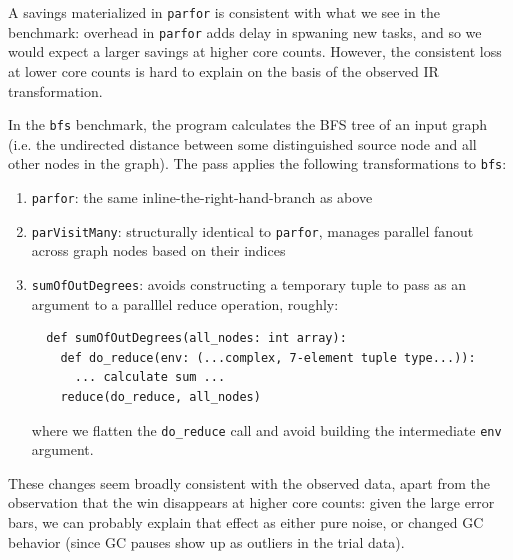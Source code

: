 
A savings materialized in \texttt{parfor} is consistent with what we see in the
benchmark: overhead in \texttt{parfor} adds delay in spwaning new tasks, and so
we would expect a larger savings at higher core counts. However, the consistent
loss at lower core counts is hard to explain on the basis of the observed IR
transformation.

In the \texttt{bfs} benchmark, the program calculates the BFS tree of an input
graph (i.e. the undirected distance between some distinguished source node and
all other nodes in the graph). The pass applies the following transformations to
\texttt{bfs}:
\begin{enumerate}
\item \texttt{parfor}: the same inline-the-right-hand-branch as above

\item \texttt{parVisitMany}: structurally identical to \texttt{parfor}, manages
  parallel fanout across graph nodes based on their indices

\item \texttt{sumOfOutDegrees}: avoids constructing a temporary tuple to pass as
  an argument to a paralllel reduce operation, roughly:

\begin{verbatim}
  def sumOfOutDegrees(all_nodes: int array):
    def do_reduce(env: (...complex, 7-element tuple type...)):
      ... calculate sum ...
    reduce(do_reduce, all_nodes)
\end{verbatim}

where we flatten the \texttt{do\_reduce} call and avoid building the intermediate
\texttt{env} argument.

\end{enumerate}

These changes seem broadly consistent with the observed data, apart from the
observation that the win disappears at higher core counts: given the large error
bars, we can probably explain that effect as either pure noise, or changed GC
behavior (since GC pauses show up as outliers in the trial data).


